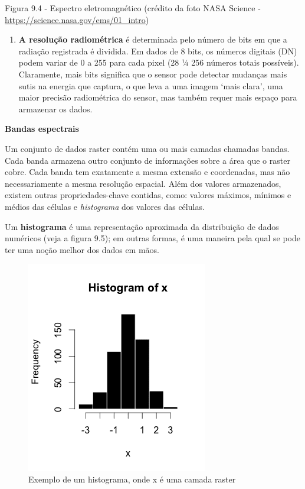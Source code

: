 \documentclass[
]{krantz}
\providecommand{\tightlist}{%
  \setlength{\itemsep}{0pt}\setlength{\parskip}{0pt}}
\begin{document}
Figura 9.4 - Espectro eletromagnético (crédito da foto NASA Science - \url{https://science.nasa.gov/ems/01_intro})

\begin{enumerate}
\def\labelenumi{\arabic{enumi}.}
\setcounter{enumi}{3}
\tightlist
\item
  \textbf{A resolução radiométrica} é determinada pelo número de bits em que a radiação registrada é dividida. Em dados de 8 bits, os números digitais (DN) podem variar de 0 a 255 para cada pixel (28 ¼ 256 números totais possíveis). Claramente, mais bits significa que o sensor pode detectar mudanças mais sutis na energia que captura, o que leva a uma imagem `mais clara', uma maior precisão radiométrica do sensor, mas também requer mais espaço para armazenar os dados.
\end{enumerate}

\textbf{Bandas espectrais}

Um conjunto de dados raster contém uma ou mais camadas chamadas bandas. Cada banda armazena outro conjunto de informações sobre a área que o raster cobre. Cada banda tem exatamente a mesma extensão e coordenadas, mas não necessariamente a mesma resolução espacial. Além dos valores armazenados, existem outras propriedades-chave contidas, como: valores máximos, mínimos e médios das células e \emph{histograma} dos valores das células.

Um \textbf{histograma} é uma representação aproximada da distribuição de dados numéricos (veja a figura 9.5); em outras formas, é uma maneira pela qual se pode ter uma noção melhor dos dados em mãos.

\begin{figure}
\centering
\includegraphics{media/modulo9/fig95.png}
\caption{Exemplo de um histograma, onde x é uma camada raster}
\end{figure}
\end{document}
